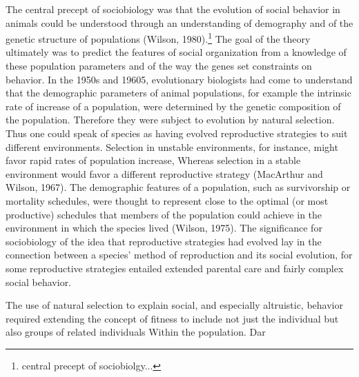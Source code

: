 \documentclass[12pt]{letter}
\begin{document}
The central precept of sociobiology was that the evolution of social behavior in animals could be understood through an understanding of demography and of the genetic structure of populations (Wilson, 1980).\footnote{central precept of sociobiolgy...} The goal of the theory ultimately was to predict the features of social organization from a knowledge of these population parameters and of the way the genes set constraints on behavior. In the 1950s and 19605, evolutionary biologists had come to understand that the demographic parameters of animal populations, for example the intrinsic rate of increase of a population, were determined by the genetic composition of the population. Therefore they were subject to evolution by natural selection. Thus one could speak of species as having evolved reproductive strategies to suit different environments. Selection in unstable environments, for instance, might favor rapid rates of population increase, Whereas selection in a stable environment would favor a different reproductive strategy (MacArthur and Wilson, 1967). The demographic features of a population, such as survivorship or mortality schedules, were thought to represent close to the optimal (or most productive) schedules that members of the population could achieve in the environment in which the species lived (Wilson, 1975). The significance for sociobiology of the idea that reproductive strategies had evolved lay in the connection between a species’ method of reproduction and its social evolution, for some reproductive strategies entailed extended parental care and fairly complex social behavior.

The use of natural selection to explain social, and especially altruistic, behavior required extending the concept of fitness to include not just the individual but also groups of related individuals Within the population. Dar
\end{document}
